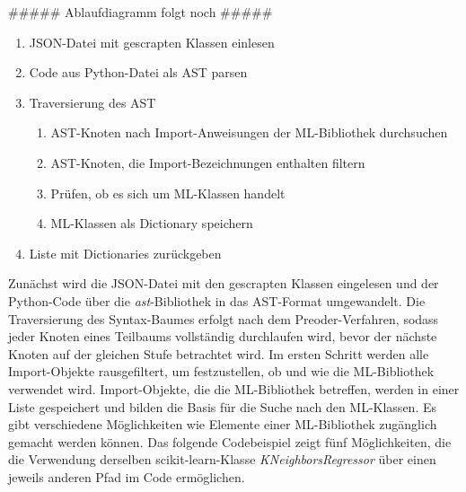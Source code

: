 \documentclass[german,bachelor]{swsLeipzig}
\begin{document}
\#\#\#\#\# Ablaufdiagramm folgt noch \#\#\#\#\#
\begin{enumerate}
 \item JSON-Datei mit gescrapten Klassen einlesen
 \item Code aus Python-Datei als AST parsen
 \item Traversierung des AST
\begin{enumerate}
    \item AST-Knoten nach Import-Anweisungen der ML-Bibliothek durchsuchen
    \item AST-Knoten, die Import-Bezeichnungen enthalten filtern
    \item Prüfen, ob es sich um ML-Klassen handelt
    \item ML-Klassen als Dictionary speichern
    \end{enumerate}
 \item Liste mit Dictionaries zurückgeben
\end{enumerate}

Zunächst wird die JSON-Datei mit den gescrapten Klassen eingelesen und der Python-Code über die \textit{ast}-Bibliothek in das AST-Format umgewandelt.
Die Traversierung des Syntax-Baumes erfolgt nach dem Preoder-Verfahren, sodass jeder Knoten eines Teilbaums vollständig
durchlaufen wird, bevor der nächste Knoten auf der gleichen Stufe betrachtet wird.
Im ersten Schritt werden alle Import-Objekte rausgefiltert, um festzustellen, ob und wie die ML-Bibliothek verwendet wird.
Import-Objekte, die die ML-Bibliothek betreffen, werden in einer Liste gespeichert und bilden die Basis für die Suche nach
den ML-Klassen.
Es gibt verschiedene Möglichkeiten wie Elemente einer ML-Bibliothek zugänglich gemacht werden können.
Das folgende Codebeispiel zeigt fünf Möglichkeiten, die die Verwendung derselben scikit-learn-Klasse \textit{KNeighborsRegressor}
über einen jeweils anderen Pfad im Code ermöglichen. \\
\end{document}
